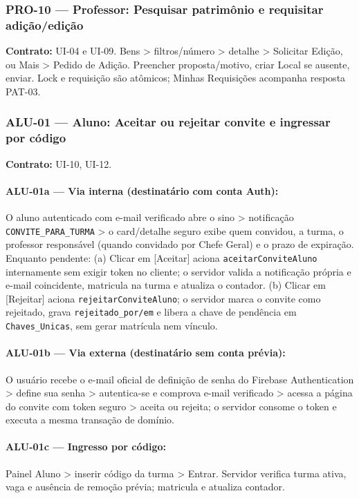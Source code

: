 \subsubsection{PRO-10 --- Professor: Pesquisar patrimônio e requisitar adição/edição}
\textbf{Contrato:} UI-04 e UI-09. Bens > filtros/número > detalhe > Solicitar Edição, ou Mais > Pedido de Adição. Preencher proposta/motivo, criar Local se ausente, enviar. Lock e requisição são atômicos; Minhas Requisições acompanha resposta PAT-03.

\subsubsection{ALU-01 --- Aluno: Aceitar ou rejeitar convite e ingressar por código}
\textbf{Contrato:} UI-10, UI-12.
\paragraph{ALU-01a --- Via interna (destinatário com conta Auth):} O aluno autenticado com e-mail verificado abre o sino > notificação \texttt{CONVITE\_PARA\_TURMA} > o card/detalhe seguro exibe quem convidou, a turma, o professor responsável (quando convidado por Chefe Geral) e o prazo de expiração. Enquanto pendente:
(a) Clicar em [Aceitar] aciona \texttt{aceitarConviteAluno} internamente sem exigir token no cliente; o servidor valida a notificação própria e e-mail coincidente, matricula na turma e atualiza o contador.
(b) Clicar em [Rejeitar] aciona \texttt{rejeitarConviteAluno}; o servidor marca o convite como rejeitado, grava \texttt{rejeitado\_por/em} e libera a chave de pendência em \texttt{Chaves\_Unicas}, sem gerar matrícula nem vínculo.

\paragraph{ALU-01b --- Via externa (destinatário sem conta prévia):} O usuário recebe o e-mail oficial de definição de senha do Firebase Authentication > define sua senha > autentica-se e comprova e-mail verificado > acessa a página do convite com token seguro > aceita ou rejeita; o servidor consome o token e executa a mesma transação de domínio.

\paragraph{ALU-01c --- Ingresso por código:} Painel Aluno > inserir código da turma > Entrar. Servidor verifica turma ativa, vaga e ausência de remoção prévia; matricula e atualiza contador.

